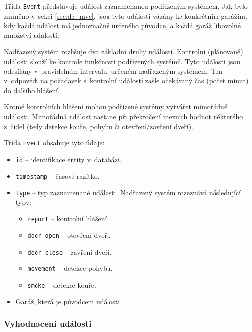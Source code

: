 Třída \texttt{Event} představuje událost zaznamenanou podřízeným systémem. Jak bylo zmíněno v~sekci \ref{sec:de_mvc}, jsou tyto události vázány ke konkrétním garážím, kdy každá událost má jednoznačně určeného původce, a každá garáž libovolné množství událostí.

Nadřazený systém rozlišuje dva základní druhy událostí. Kontrolní (plánované) události slouží ke kontrole funkčnosti podřízených systémů. Tyto události jsou odesílány v~pravidelném intervalu, určeném nadřazeným systémem. Ten v~odpovědi na požadavek s~kontrolní událostí zašle očekávaný čas (počet minut) do dalšího hlášení.

Kromě kontrolních hlášení mohou podřízené systémy vytvářet mimořádné události. Mimořádná událost nastane při překročení mezních hodnot některého z~čidel (tedy detekce kouře, pohybu či otevření/zavření dveří).

Třída \texttt{Event} obsahuje tyto údaje:

\begin{itemize}
    \item \texttt{id} -- identifikace entity v~databázi.
    \item \texttt{timestamp} -- časové razítko.
    \item \texttt{type} -- typ zaznamenané události. Nadřazený systém rozeznává následující typy:
    \begin{itemize}
        \item \texttt{report} -- kontrolní hlášení.
        \item \texttt{door\_open} -- otevření dveří.
        \item \texttt{door\_close} -- zavření dveří.
        \item \texttt{movement} -- detekce pohybu.
        \item \texttt{smoke} -- detekce kouře.
    \end{itemize}
    \item Garáž, která je původcem události.
\end{itemize}

\subsubsection{Vyhodnocení události}
\label{sec:de_event_eval}

